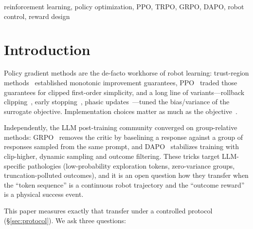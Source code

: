 \documentclass[journal,twoside]{IEEEtran}
\newcommand{\ppo}{\textsc{PPO}}
\newcommand{\grpo}{\textsc{GRPO-C}}
\newcommand{\dapo}{\textsc{DAPO-C}}
\begin{document}
\begin{abstract}
group-relative methods transfer poorly: with episode-outcome baselines
\grpo{} reaches only 0.557 on navigation---mid-pack, below every
safeguarded PPO variant---\dapo{} 0.324, and both are near-zero on
locomotion and manipulation under dense rewards, because outcome-level
credit cannot guide multi-stage physical control. Algorithm rankings are
reward-paradigm-dependent---potential-based shaping rescues sparse-reward
training on navigation and grasping yet collapses on locomotion---so
algorithm and reward must be chosen jointly. We release the suite, all
runs and per-term reward audits as an open benchmark connecting LLM
post-training methods back to robot control.
\end{abstract}

\begin{IEEEkeywords}
reinforcement learning, policy optimization, PPO, TRPO, GRPO, DAPO,
robot control, reward design
\end{IEEEkeywords}

\section{Introduction}
Policy gradient methods are the de-facto workhorse of robot learning:
trust-region methods~\cite{schulman2015trpo} established monotonic
improvement guarantees, \ppo{}~\cite{schulman2017ppo} traded those
guarantees for clipped first-order simplicity, and a long line of
variants---rollback clipping~\cite{yuan2020rollback}, early
stopping~\cite{li2023espo}, phasic updates~\cite{cobbe2021ppg}---tuned the
bias/variance of the surrogate objective. Implementation
choices matter as much as the objective~\cite{engstrom2020implementation}.

Independently, the LLM post-training community converged on group-relative
methods: GRPO~\cite{shao2024grpo} removes the critic by baselining a
response against a group of responses sampled from the same prompt, and
DAPO~\cite{yu2025dapo} stabilizes training with clip-higher, dynamic
sampling and outcome filtering. These tricks target LLM-specific
pathologies (low-probability exploration tokens, zero-variance groups,
truncation-polluted outcomes), and it is an open question how they transfer
when the ``token sequence'' is a continuous robot trajectory and the
``outcome reward'' is a physical success event.

This paper measures exactly that transfer under a controlled protocol
(\S\ref{sec:protocol}). We ask three questions:
\end{document}
